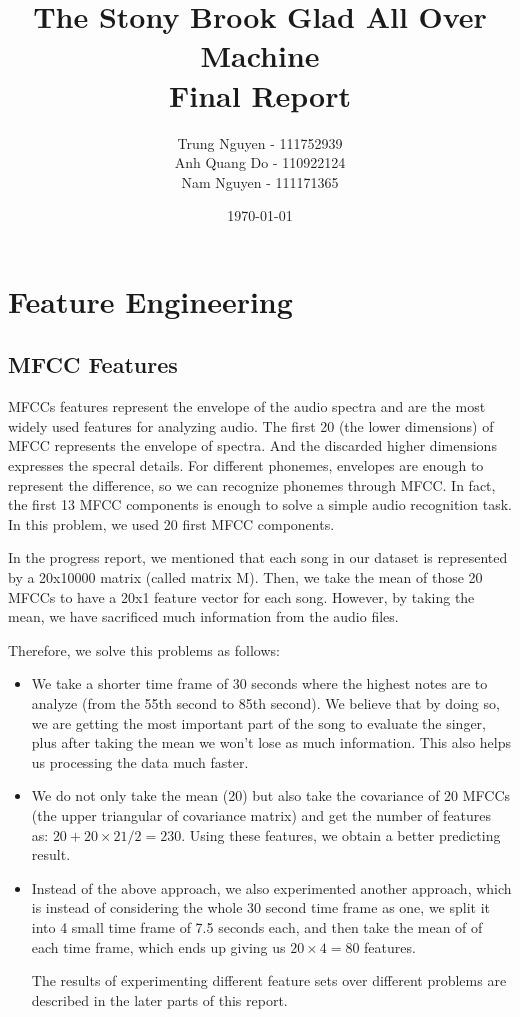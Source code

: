 \documentclass[paper=a4, fontsize=11pt, DIV=13]{scrartcl}
\begin{document}
\title{The Stony Brook Glad All Over Machine\\ Final Report}
\author{Trung Nguyen - 111752939
\\Anh Quang Do - 110922124
\\Nam Nguyen - 111171365}
\date{\today}
\maketitle
  
\section{Feature Engineering}

\subsection{MFCC Features} 
MFCCs features represent the envelope of the audio spectra and are the most widely used features for analyzing audio. The first 20 (the lower dimensions) of MFCC represents the envelope of spectra. And the discarded higher dimensions expresses the specral details. For different phonemes, envelopes are enough to represent the difference, so we can recognize phonemes through MFCC. In fact, the first 13 MFCC components is enough to solve a simple audio recognition task. In this problem, we used 20 first MFCC components.

In the progress report, we mentioned that each song in our dataset is represented by a 20x10000 matrix (called matrix M). Then, we take the mean of those 20 MFCCs to have a 20x1 feature vector for each song. However, by taking the mean, we have sacrificed much information from the audio files. 

Therefore, we solve this problems as follows: 

\begin{itemize}

\item We take a shorter time frame of 30 seconds where the highest notes are to analyze (from the 55th second to 85th second). We believe that by doing so, we are getting the most important part of the song to evaluate the singer, plus after taking the mean we won’t lose as much information. This also helps us processing the data much faster.

\item We do not only take the mean (20) but also take the covariance of 20 MFCCs (the upper triangular of covariance matrix) and get the number of features as: $20 + 20 \times 21/2 = 230$. Using these features, we obtain a better predicting result. 

\item Instead of the above approach, we also experimented another approach, which is instead of considering the whole 30 second time frame as one, we split it into 4 small time frame of 7.5 seconds each, and then take the mean of of each time frame, which ends up giving us $20 \times 4 = 80$ features.

The results of experimenting different feature sets over different problems are described in the later parts of this report.
\end{itemize}
\end{document}
